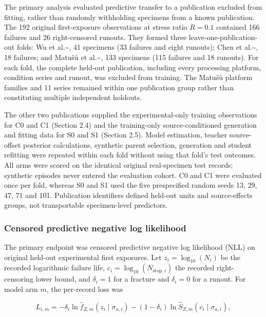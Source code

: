 \documentclass[12pt,a4paper]{article}
\begin{document}
The primary analysis evaluated predictive transfer to a publication excluded from fitting, rather than randomly withholding specimens from a known publication. The 192 original first-exposure observations at stress ratio \(R=0.1\) contained 166 failures and 26 right-censored runouts. They formed three leave-one-publication-out folds: Wu et al.\textasciitilde{}\cite{wu2021}, 41 specimens (33 failures and eight runouts); Chen et al.\textasciitilde{}\cite{chen2024}, 18 failures; and Matušů et al.\textasciitilde{}\cite{matusu2026}, 133 specimens (115 failures and 18 runouts). For each fold, the complete held-out publication, including every processing platform, condition series and runout, was excluded from training. The Matušů platform families and 11 series remained within one publication group rather than constituting multiple independent holdouts.

The other two publications supplied the experimental-only training observations for C0 and C1 (Section 2.4) and the training-only source-conditioned generation and fitting data for S0 and S1 (Section 2.5). Model estimation, teacher source-offset posterior calculations, synthetic parent selection, generation and student refitting were repeated within each fold without using that fold's test outcomes. All arms were scored on the identical original real-specimen test records; synthetic episodes never entered the evaluation cohort. C0 and C1 were evaluated once per fold, whereas S0 and S1 used the five prespecified random seeds 13, 29, 47, 71 and 101. Publication identifiers defined held-out units and source-effects groups, not transportable specimen-level predictors.

\subsubsection{Censored predictive negative log likelihood}

The primary endpoint was censored predictive negative log likelihood (NLL) on original held-out experimental first exposures. Let \(z_i=\log_{10}(N_i)\) be the recorded logarithmic failure life, \(c_i=\log_{10}(N_{\mathrm{stop},i})\) the recorded right-censoring lower bound, and \(\delta_i=1\) for a fracture and \(\delta_i=0\) for a runout. For model arm \(m\), the per-record loss was

\begin{equation}
L_{i,m}=-\delta_i\ln \widehat f_{Z,m}(z_i\mid\sigma_{a,i})
-(1-\delta_i)\ln \widehat S_{Z,m}(c_i\mid\sigma_{a,i}),
\tag{2.6a}
\end{equation}
\end{document}
